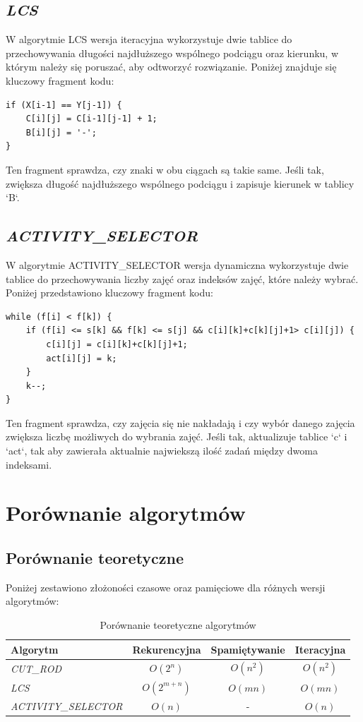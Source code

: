 \documentclass{article}
\begin{document}
	\subsection{\textit{LCS}}
	W algorytmie LCS wersja iteracyjna wykorzystuje dwie tablice do przechowywania długości najdłuższego wspólnego podciągu oraz kierunku, w którym należy się poruszać, aby odtworzyć rozwiązanie. Poniżej znajduje się kluczowy fragment kodu:
	
	\begin{lstlisting}
if (X[i-1] == Y[j-1]) {
	C[i][j] = C[i-1][j-1] + 1;
	B[i][j] = '-';
}
	\end{lstlisting}
	Ten fragment sprawdza, czy znaki w obu ciągach są takie same. Jeśli tak, zwiększa długość najdłuższego wspólnego podciągu i zapisuje kierunek w tablicy `B`.
	
	\subsection{\textit{ACTIVITY\_SELECTOR}}
	W algorytmie ACTIVITY\_SELECTOR wersja dynamiczna wykorzystuje dwie tablice do przechowywania liczby zajęć oraz indeksów zajęć, które należy wybrać. Poniżej przedstawiono kluczowy fragment kodu:
	
	\begin{lstlisting}
while (f[i] < f[k]) {
	if (f[i] <= s[k] && f[k] <= s[j] && c[i][k]+c[k][j]+1> c[i][j]) {
		c[i][j] = c[i][k]+c[k][j]+1;
		act[i][j] = k;
	}
	k--;
}
	\end{lstlisting}
	Ten fragment sprawdza, czy zajęcia się nie nakładają i czy wybór danego zajęcia zwiększa liczbę możliwych do wybrania zajęć. Jeśli tak, aktualizuje tablice `c` i `act`, tak aby zawierała aktualnie najwiekszą ilość zadań między dwoma indeksami.
	\newpage
	\section{Porównanie algorytmów}
	
	\subsection{Porównanie teoretyczne}
	Poniżej zestawiono złożoności czasowe oraz pamięciowe dla różnych wersji algorytmów:
	
	\begin{table}[H]
		\begin{tabular}{|l|c|c|c|}
			\hline
			\textbf{Algorytm} & \textbf{Rekurencyjna} & \textbf{Spamiętywanie} & \textbf{Iteracyjna} \\ \hline
			\textit{CUT\_ROD} & $O(2^n)$ & $O(n^2)$ & $O(n^2)$ \\ \hline
			\textit{LCS} & $O(2^{m+n})$ & $O(mn)$ & $O(mn)$ \\ \hline
			\textit{ACTIVITY\_SELECTOR} & $O(n)$ & - & $O(n)$ \\ \hline
		\end{tabular}
		\caption{Porównanie teoretyczne algorytmów}
	\end{table}
	
\end{document}

